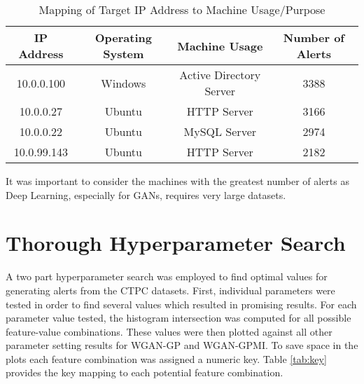 \begin{table}[!htbp]
	\caption{Mapping of Target IP Address to Machine Usage/Purpose}
	\label{tab:mapping}
	\centering
	\begin{tabular}{c|c|c|c}
		\textbf{IP Address} & \textbf{Operating System} & \textbf{Machine Usage} & \textbf{Number of Alerts}\\
		\hline
		10.0.0.100 & Windows & Active Directory Server & 3388\\
		\hline
		10.0.0.27 & Ubuntu & HTTP Server & 3166\\
		\hline
		10.0.0.22 & Ubuntu & MySQL Server & 2974\\
		\hline
		10.0.99.143 & Ubuntu & HTTP Server & 2182
	\end{tabular}
\end{table}

It was important to consider the machines with the greatest number of alerts as Deep Learning, especially for GANs, requires very large datasets.

\section{Thorough Hyperparameter Search}
\label{sec:search}
A two part hyperparameter search was employed to find optimal values for generating alerts from the CTPC datasets. First, individual parameters were tested in order to find several values which resulted in promising results. For each parameter value tested, the histogram intersection was computed for all possible feature-value combinations. These values were then plotted against all other parameter setting results for WGAN-GP and WGAN-GPMI. To save space in the plots each feature combination was assigned a numeric key. Table \ref{tab:key} provides the key mapping to each potential feature combination. 

